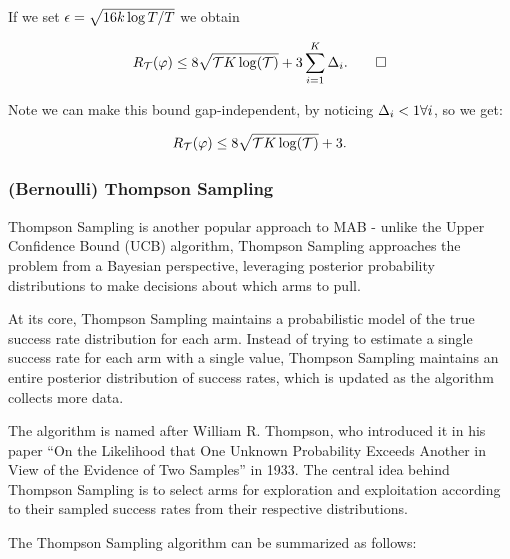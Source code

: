 If we set $\epsilon = \sqrt{16k \log T/T}$ we obtain 

$$R_{\mathcal{T}}(\varphi) \leq 8 \sqrt{\mathcal{T} K \log(\mathcal{T})} + 3 \sum_{i=1}^{K} \Delta_{i}. \qed$$

Note we can make this bound gap-independent, by noticing $\Delta_{i} < 1 \forall i$, so we get:

$$R_{\mathcal{T}}(\varphi) \leq 8 \sqrt{\mathcal{T} K \log(\mathcal{T})} + 3.$$


\subsubsection{(Bernoulli) Thompson Sampling}
\label{sec:BernoulliThompsonSampling}
Thompson Sampling is another popular approach to MAB - unlike the Upper Confidence Bound (UCB) algorithm, Thompson Sampling approaches the problem from a Bayesian perspective, leveraging posterior probability distributions to make decisions about which arms to pull.

At its core, Thompson Sampling maintains a probabilistic model of the true success rate distribution for each arm. Instead of trying to estimate a single success rate for each arm with a single value, Thompson Sampling maintains an entire posterior distribution of success rates, which is updated as the algorithm collects more data.

The algorithm is named after William R. Thompson, who introduced it in his paper ``On the Likelihood that One Unknown Probability Exceeds Another in View of the Evidence of Two Samples'' \cite{Thompson_1933} in 1933. The central idea behind Thompson Sampling is to select arms for exploration and exploitation according to their sampled success rates from their respective distributions.

The Thompson Sampling algorithm can be summarized as follows:


